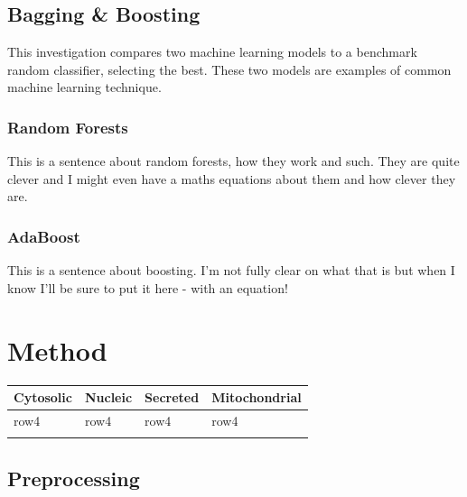 \documentclass{bioinfo}
\begin{document}

\subsection{Bagging \& Boosting}
This investigation compares two machine learning models to a benchmark random classifier, selecting the best. These two models are examples of common machine learning technique.

\subsubsection{Random Forests}

This is a sentence about random forests, how they work and such. They are quite clever and I might even have a maths equations about them  and how clever they are.
\subsubsection{AdaBoost}

This is a sentence about boosting. I'm not fully clear on what that is but when I know I'll be sure to put it here - with an equation!

\section{Method}

\begin{table}[!t]
 {\begin{tabular}{@{}llll@{}}\toprule Cytosolic &
Nucleic & Secreted & Mitochondrial\\\midrule
row4 & row4 & row4 & row4\\\botrule
\end{tabular}}{}
\end{table}

\subsection{Preprocessing}
\end{document}
